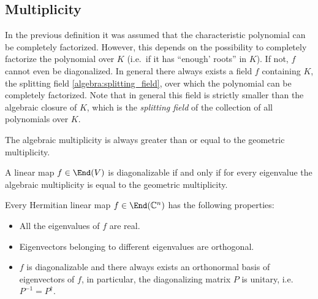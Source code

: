 \subsection{Multiplicity}

    \begin{remark}
        In the previous definition it was assumed that the characteristic polynomial can be completely factorized. However, this depends on the possibility to completely factorize the polynomial over $K$ (i.e.~if it has ``enough' roots'' in $K$). If not, $f$ cannot even be diagonalized. In general there always exists a field $f$ containing $K$, the splitting field \ref{algebra:splitting_field}, over which the polynomial can be completely factorized. Note that in general this field is strictly smaller than the algebraic closure of $K$, which is the \textit{splitting field} of the collection of all polynomials over $K$.
    \end{remark}

    \begin{property}
        The algebraic multiplicity is always greater than or equal to the geometric multiplicity.
    \end{property}
    \begin{theorem}\label{linalgebra:diagonalizable_multiplicity}
        A linear map $f\in\End(V)$ is diagonalizable if and only if for every eigenvalue the algebraic multiplicity is equal to the geometric multiplicity.
    \end{theorem}

    \begin{property}\label{linalgebra:diagonalizable_hermitian}
        Every Hermitian linear map $f\in\End(\mathbb{C}^n)$ has the following properties:
        \begin{itemize}
            \item All the eigenvalues of $f$ are real.
            \item Eigenvectors belonging to different eigenvalues are orthogonal.
            \item $f$ is diagonalizable and there always exists an orthonormal basis of eigenvectors of $f$, in particular, the diagonalizing matrix $P$ is unitary, i.e.~$P^{-1} = P^\dag$.
        \end{itemize}
    \end{property}

